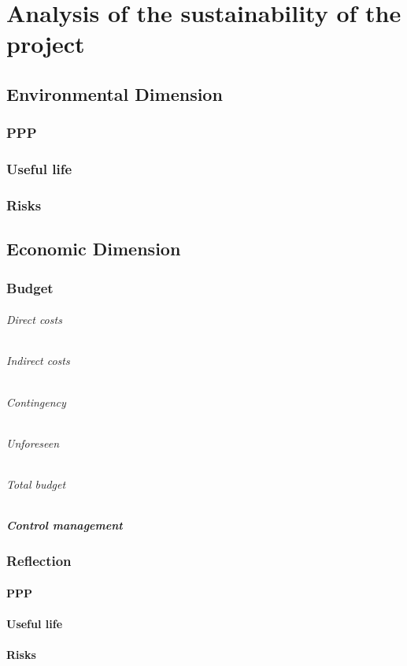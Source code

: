 
\chapter{Analysis of the sustainability of the project} %

\label{Chapter2}

\section{Environmental Dimension }
\subsection{PPP}
\subsection{Useful life}
\subsection{Risks}

\section{Economic Dimension }

\subsection{Budget}
\subparagraph{Direct costs}
\subparagraph{Indirect costs}
\subparagraph{Contingency}
\subparagraph{Unforeseen}
\subparagraph{Total budget}
\paragraph{Control management}

\subsection{Reflection}
\subsubsection{PPP}
\subsubsection{Useful life}
\subsubsection{Risks}